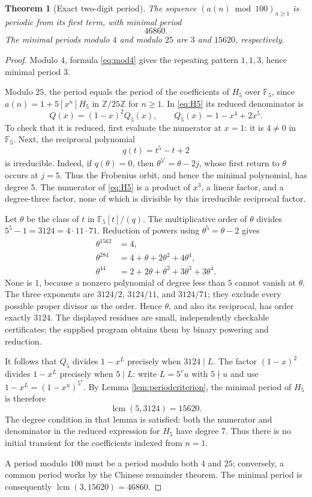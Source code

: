 \documentclass[11pt,letterpaper]{article}
\newtheorem{theorem}{Theorem}[section]
\theoremstyle{definition}
\theoremstyle{remark}
\newcommand{\Z}{\mathbb Z}
\newcommand{\F}{\mathbb F}
\newcommand{\coeff}[1]{[x^{#1}]}
\DeclareMathOperator{\lcm}{lcm}
\begin{document}
\begin{theorem}[Exact two-digit period]\label{thm:46860}
The sequence $(a(n)\bmod100)_{n\geq1}$ is periodic from its first term,
with minimal period
\begin{equation}\label{eq:46860}
 \boxed{46860.}
\end{equation}
The minimal periods modulo $4$ and modulo $25$ are $3$ and $15620$,
respectively.
\end{theorem}
\begin{proof}
Modulo $4$, formula \eqref{eq:mod4} gives the repeating pattern
$1,1,3$, hence minimal period $3$.

Modulo $25$, the period equals the period of the coefficients of $H_5$
over $\F_5$, since $a(n)=1+5\coeff{n}H_5$ in $\Z/25\Z$ for $n\geq1$.
In \eqref{eq:H5} its reduced denominator is
\begin{equation}\label{eq:Q5}
 Q(x)=(1-x)^2Q_5(x),\qquad Q_5(x)=1-x^4+2x^5.
\end{equation}
To check that it is reduced, first evaluate the numerator at $x=1$:
it is $4\ne0$ in $\F_5$.  Next, the reciprocal polynomial
\[
 q(t)=t^5-t+2
\]
is irreducible.  Indeed, if $q(\theta)=0$, then
$\theta^{5^j}=\theta-2j$, whose first return to $\theta$ occurs at $j=5$.
Thus the Frobenius orbit, and hence the minimal polynomial, has degree
$5$.  The numerator of \eqref{eq:H5} is a product of $x^3$, a linear
factor, and a degree-three factor, none of which is divisible by this
irreducible reciprocal factor.

Let $\theta$ be the class of $t$ in $\F_5[t]/(q)$.
The multiplicative order of $\theta$ divides
$5^5-1=3124=4\cdot11\cdot71$.  Reduction of powers using
$\theta^5=\theta-2$ gives
\begin{align}
 \theta^{1562}&=4,\label{eq:cert1}\\
 \theta^{284}&=4+\theta+2\theta^2+4\theta^4,\label{eq:cert2}\\
 \theta^{44}&=2+2\theta+\theta^2+3\theta^3+3\theta^4.\label{eq:cert3}
\end{align}
None is $1$, because a nonzero polynomial of degree less than $5$
cannot vanish at $\theta$.  The three exponents are $3124/2$, $3124/11$,
and $3124/71$; they exclude every possible proper divisor as the order.
Hence $\theta$, and also its reciprocal, has order exactly $3124$.
The displayed residues are small, independently checkable certificates;
the supplied program obtains them by binary powering and reduction.

It follows that $Q_5$ divides $1-x^L$ precisely when $3124\mid L$.
The factor $(1-x)^2$ divides $1-x^L$ precisely when $5\mid L$:
write $L=5^v u$ with $5\nmid u$ and use
$1-x^L=(1-x^u)^{5^v}$.  By Lemma \ref{lem:periodcriterion}, the minimal
period of $H_5$ is therefore
\[
 \lcm(5,3124)=15620.
\]
The degree condition in that lemma is satisfied: both the numerator
and denominator in the reduced expression for $H_5$ have degree $7$.
Thus there is no initial transient for the coefficients indexed from
$n=1$.

A period modulo $100$ must be a period modulo both $4$ and $25$;
conversely, a common period works by the Chinese remainder theorem.
The minimal period is consequently
$\lcm(3,15620)=46860$.
\end{proof}
\end{document}
